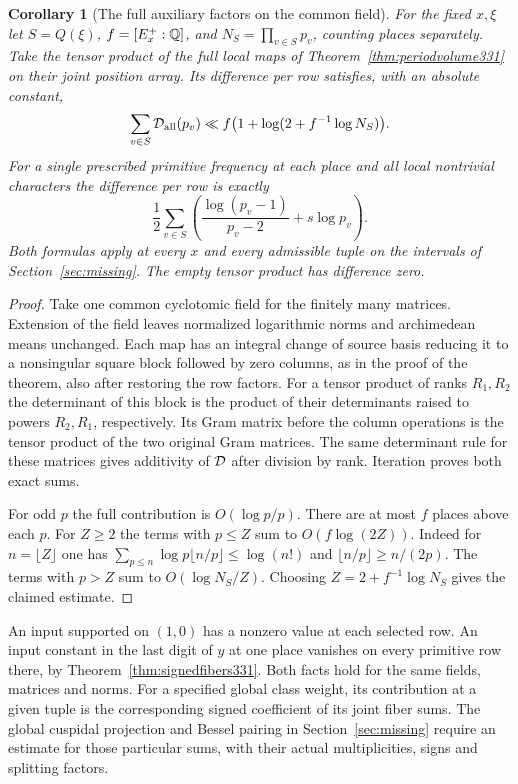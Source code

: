 \documentclass[a4paper,11pt]{article}
\newtheorem{corollary}[proposition]{Corollary}
\theoremstyle{definition}
\theoremstyle{remark}
\numberwithin{equation}{section}
\begin{document}
\begin{corollary}[The full auxiliary factors on the common field]\leavevmode
\label{cor:tuplevolume331}
For the fixed \(x,\xi\) let \(S=Q(\xi)\),
\(f=[E_x^+:\mathbb Q]\), and \(N_S=\prod_{v\in S}p_v\), counting
places separately. Take the tensor product of the full local maps
of Theorem~\ref{thm:periodvolume331} on their joint position
array. Its difference per row satisfies, with an absolute constant,
\[
   \sum_{v\in S}{\cal D}_{\rm all}(p_v)
         \ll f\bigl(1+\log(2+f^{-1}\log N_S)\bigr).
\]
For a single prescribed primitive frequency at each place and all
local nontrivial characters the difference per row is exactly
\[
   \frac12\sum_{v\in S}
     \left(\frac{\log(p_v-1)}{p_v-2}+s\log p_v\right).
\]
Both formulas apply at every \(x\) and every admissible tuple on
the intervals of Section~\ref{sec:missing}. The empty tensor
product has difference zero.
\end{corollary}
\begin{proof}
Take one common cyclotomic field for the finitely many matrices.
Extension of the field leaves normalized logarithmic norms and
archimedean means unchanged. Each map has an integral change of
source basis reducing it to a nonsingular square block followed
by zero columns, as in the proof of the theorem, also after
restoring the row factors. For a tensor product of ranks \(R_1,R_2\)
the determinant of this block is the product of their determinants
raised to powers \(R_2,R_1\), respectively. Its Gram matrix before
the column operations is the tensor product of the two original Gram
matrices. The same determinant rule for these matrices gives
additivity of \({\cal D}\) after division by rank. Iteration proves
both exact sums.

For odd \(p\) the full contribution is \(O(\log p/p)\).
There are at most \(f\) places above each \(p\). For \(Z\ge2\)
the terms with \(p\le Z\) sum to \(O(f\log(2Z))\). Indeed for
\(n=\lfloor Z\rfloor\) one has
\(\sum_{p\le n}\log p\lfloor n/p\rfloor\le \log(n!)\)
and \(\lfloor n/p\rfloor\ge n/(2p)\). The terms with \(p>Z\)
sum to \(O(\log N_S/Z)\). Choosing \(Z=2+f^{-1}\log N_S\)
gives the claimed estimate.
\end{proof}

An input supported on \((1,0)\) has a nonzero value at each
selected row. An input constant in the last digit of \(y\)
at one place vanishes on every primitive row there, by
Theorem~\ref{thm:signedfibers331}. Both facts hold for the same
fields, matrices and norms. For a specified global class weight,
its contribution at a given tuple is the corresponding signed
coefficient of its joint fiber sums. The global cuspidal projection
and Bessel pairing in Section~\ref{sec:missing} require an estimate
for those particular sums, with their actual multiplicities, signs
and splitting factors.
\end{document}
